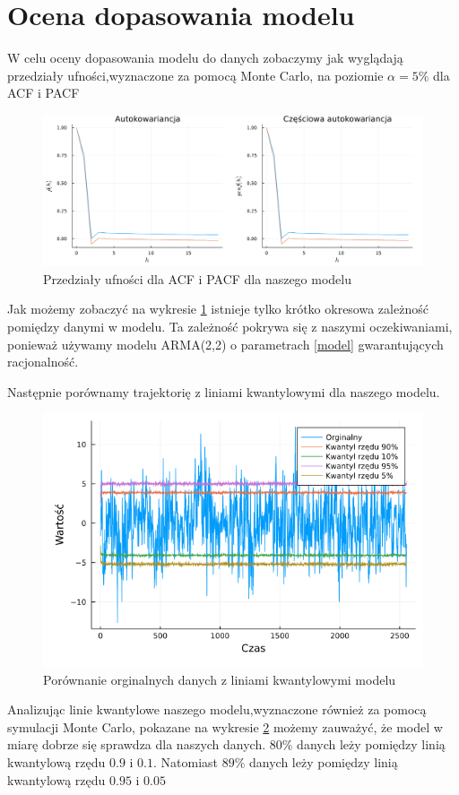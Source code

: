 \documentclass[12pt]{article}
\theoremstyle{exer}
\begin{document}
	
	
	\section{Ocena dopasowania modelu}
	W celu oceny dopasowania modelu do danych zobaczymy jak wyglądają przedziały ufności,wyznaczone za pomocą Monte Carlo, na poziomie $\alpha = 5\%$ dla ACF i PACF 
	\begin{figure}[H]
		\centering
		\includegraphics[width=3\columnwidth/4]{img/acf_pacf.png}
		\caption{Przedziały ufności dla ACF i PACF dla naszego modelu}
		\label{fig:model_acf_pacf}
	\end{figure}
	Jak możemy zobaczyć na wykresie \ref{fig:model_acf_pacf} istnieje tylko krótko okresowa zależność pomiędzy danymi w modelu. Ta zależność pokrywa się z naszymi oczekiwaniami, ponieważ używamy modelu ARMA(2,2) o parametrach \ref{model} gwarantujących racjonalność. 
	
	
	Następnie porównamy trajektorię z liniami kwantylowymi dla naszego modelu.
	\begin{figure}[H]
		\centering
		\includegraphics[width=3\columnwidth/4]{img/linie_kwantylowe.png}
		\caption{Porównanie orginalnych danych z liniami kwantylowymi modelu}
		\label{fig:linie_kwantylowe}
	\end{figure}
Analizując linie kwantylowe naszego modelu,wyznaczone również  za pomocą symulacji Monte Carlo, pokazane na wykresie \ref{fig:linie_kwantylowe} możemy zauważyć, że model w miarę dobrze się sprawdza dla naszych danych. $80\%$ danych leży pomiędzy linią kwantylową rzędu $0.9$ i $0.1$. Natomiast $89\%$  danych leży pomiędzy linią kwantylową rzędu $0.95$ i $0.05$
\end{document}
